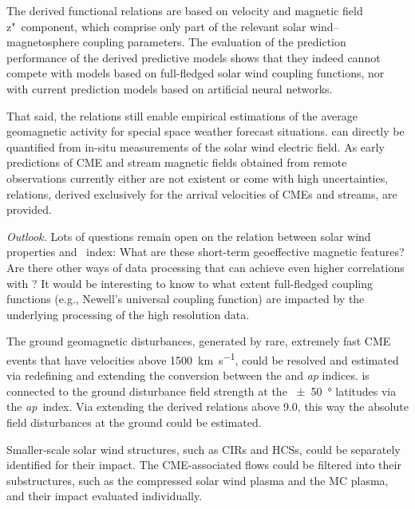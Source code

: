 The derived functional relations are based on velocity and magnetic field z"~component, which comprise only part of the relevant solar wind--magnetosphere coupling parameters. The evaluation of the prediction performance of the derived predictive models shows that they indeed cannot compete with models based on full-fledged solar wind coupling functions, nor with current prediction models based on artificial neural networks.

That said, the relations still enable empirical estimations of the average geomagnetic activity for special space weather forecast situations. \Kp{} can directly be quantified from in-situ measurements of the solar wind electric field. As early predictions of CME and stream magnetic fields obtained from remote observations currently either are not existent or come with high uncertainties, \Kp{} relations, derived exclusively for the arrival velocities of CMEs and streams, are provided.

\bigskip

\noindent \textit{Outlook.}
Lots of questions remain open on the relation between solar wind properties and \Kp~index: What are these short-term geoeffective magnetic features? Are there other ways of data processing that can achieve even higher correlations with \Kp{}?
It would be interesting to know to what extent full-fledged coupling functions (e.g., Newell's universal coupling function) are impacted by the underlying processing of the high resolution data.

The ground geomagnetic disturbances, generated by rare, extremely fast CME events that have velocities above \SI{1500}{\km\per\s}, could be resolved and estimated via redefining and extending the conversion between the \Kp{} and \textit{ap} indices. \Kp{} is connected to the ground disturbance field strength at the \SI{+-50}{\degree} latitudes via the \textit{ap}~index. Via extending the derived \Kp{} relations above \num{9.0}, this way the absolute field disturbances at the ground could be estimated.

Smaller-scale solar wind structures, such as CIRs and HCSs, could be separately identified for their \Kp{} impact. The CME-associated flows could be filtered into their substructures, such as the compressed solar wind plasma and the MC plasma, and their \Kp{} impact evaluated individually.

